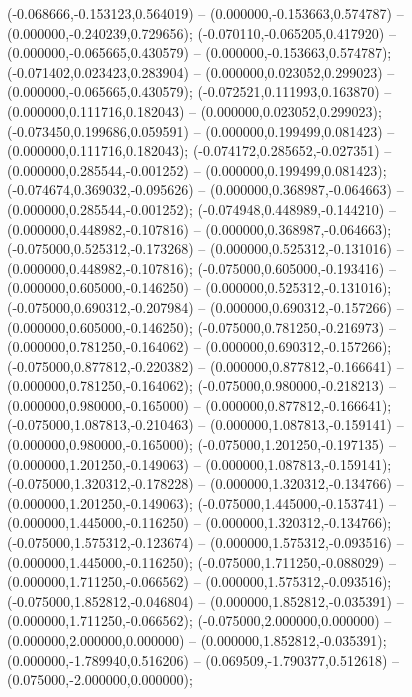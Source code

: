  (-0.068666,-0.153123,0.564019) -- (0.000000,-0.153663,0.574787) -- (0.000000,-0.240239,0.729656);
 (-0.070110,-0.065205,0.417920) -- (0.000000,-0.065665,0.430579) -- (0.000000,-0.153663,0.574787);
 (-0.071402,0.023423,0.283904) -- (0.000000,0.023052,0.299023) -- (0.000000,-0.065665,0.430579);
 (-0.072521,0.111993,0.163870) -- (0.000000,0.111716,0.182043) -- (0.000000,0.023052,0.299023);
 (-0.073450,0.199686,0.059591) -- (0.000000,0.199499,0.081423) -- (0.000000,0.111716,0.182043);
 (-0.074172,0.285652,-0.027351) -- (0.000000,0.285544,-0.001252) -- (0.000000,0.199499,0.081423);
 (-0.074674,0.369032,-0.095626) -- (0.000000,0.368987,-0.064663) -- (0.000000,0.285544,-0.001252);
 (-0.074948,0.448989,-0.144210) -- (0.000000,0.448982,-0.107816) -- (0.000000,0.368987,-0.064663);
 (-0.075000,0.525312,-0.173268) -- (0.000000,0.525312,-0.131016) -- (0.000000,0.448982,-0.107816);
 (-0.075000,0.605000,-0.193416) -- (0.000000,0.605000,-0.146250) -- (0.000000,0.525312,-0.131016);
 (-0.075000,0.690312,-0.207984) -- (0.000000,0.690312,-0.157266) -- (0.000000,0.605000,-0.146250);
 (-0.075000,0.781250,-0.216973) -- (0.000000,0.781250,-0.164062) -- (0.000000,0.690312,-0.157266);
 (-0.075000,0.877812,-0.220382) -- (0.000000,0.877812,-0.166641) -- (0.000000,0.781250,-0.164062);
 (-0.075000,0.980000,-0.218213) -- (0.000000,0.980000,-0.165000) -- (0.000000,0.877812,-0.166641);
 (-0.075000,1.087813,-0.210463) -- (0.000000,1.087813,-0.159141) -- (0.000000,0.980000,-0.165000);
 (-0.075000,1.201250,-0.197135) -- (0.000000,1.201250,-0.149063) -- (0.000000,1.087813,-0.159141);
 (-0.075000,1.320312,-0.178228) -- (0.000000,1.320312,-0.134766) -- (0.000000,1.201250,-0.149063);
 (-0.075000,1.445000,-0.153741) -- (0.000000,1.445000,-0.116250) -- (0.000000,1.320312,-0.134766);
 (-0.075000,1.575312,-0.123674) -- (0.000000,1.575312,-0.093516) -- (0.000000,1.445000,-0.116250);
 (-0.075000,1.711250,-0.088029) -- (0.000000,1.711250,-0.066562) -- (0.000000,1.575312,-0.093516);
 (-0.075000,1.852812,-0.046804) -- (0.000000,1.852812,-0.035391) -- (0.000000,1.711250,-0.066562);
 (-0.075000,2.000000,0.000000) -- (0.000000,2.000000,0.000000) -- (0.000000,1.852812,-0.035391);
 (0.000000,-1.789940,0.516206) -- (0.069509,-1.790377,0.512618) -- (0.075000,-2.000000,0.000000);

